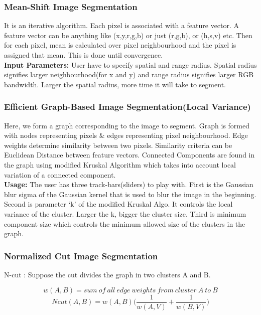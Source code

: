 \documentclass[12pt]{article}
\begin{document}
\subsubsection{Mean-Shift Image Segmentation}

It is an iterative algorithm. Each pixel is associated with a feature vector. A feature vector can be anything like (x,y,r,g,b) or just (r,g,b), or (h,s,v) etc. Then for each pixel, mean is calculated over pixel neighbourhood and the pixel is assigned that mean. This is done until convergence.\\

\textbf{Input Parameters:} User have to specify spatial and range radius. Spatial radius signifies larger neighbourhood(for x and y) and range radius signifies larger RGB bandwidth. Larger the spatial radius, more time it will take to segment.\\

\subsubsection{Efficient Graph-Based Image Segmentation(Local Variance)}

Here, we form a graph corresponding to the image to segment. Graph is formed with nodes representing pixels \& edges representing pixel neighbourhood. Edge weights determine similarity between two pixels. Similarity criteria can be Euclidean Distance between feature vectors. Connected Components are found in the graph using modified Kruskal Algorithm which takes into account local variation of a connected component.\\

\textbf{Usage:} The user has three track-bars(sliders) to play with. First is the Gaussian blur sigma of the Gaussian kernel that is used to blur the image in the beginning. Second is parameter `k' of the modified Kruskal Algo. It controls the local variance of the cluster. Larger the k, bigger the cluster size. Third is minimum component size which controls the minimum allowed size of the clusters in the graph.\\

\subsubsection{Normalized Cut Image Segmentation}

N-cut : Suppose the cut divides the graph in two clusters A and B.

$$ w(A,B) = sum\  of\  all\  edge\  weights\  from\  cluster\  A\  to\  B $$
$$ Ncut(A,B) = w(A,B)\bigg( \frac{1}{w(A,V)} + \frac{1}{w(B,V)} \bigg) $$
\end{document}
